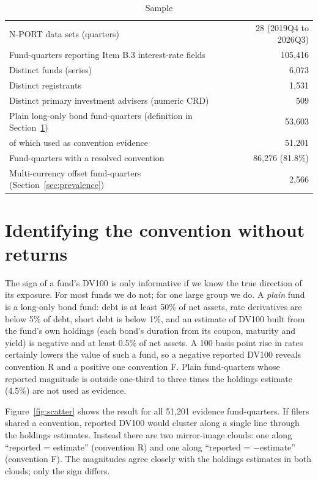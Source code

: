 \documentclass[11pt]{article}
\begin{document}
\begin{table}[!htb]
\centering\small
\caption{Sample}\label{tab:sample}
\begin{tabular}{lr}
\toprule
N-PORT data sets (quarters) & 28 (2019Q4 to 2026Q3) \\
Fund-quarters reporting Item B.3 interest-rate fields & 105,416 \\
Distinct funds (series) & 6,073 \\
Distinct registrants & 1,531 \\
Distinct primary investment advisers (numeric CRD) & 509 \\
Plain long-only bond fund-quarters (definition in Section~\ref{sec:method}) & 53,603 \\
\quad of which used as convention evidence & 51,201 \\
Fund-quarters with a resolved convention & 86,276 (81.8\%) \\
Multi-currency offset fund-quarters (Section~\ref{sec:prevalence}) & 2,566 \\
\bottomrule
\end{tabular}
\end{table}

\section{Identifying the convention without returns}\label{sec:method}

The sign of a fund's DV100 is only informative if we know the true direction of its exposure. For
most funds we do not; for one large group we do. A \emph{plain} fund is a long-only bond fund: debt
is at least 50\% of net assets, rate derivatives are below 5\% of debt, short debt is below 1\%, and
an estimate of DV100 built from the fund's own holdings (each bond's duration from its coupon,
maturity and yield) is negative and at least 0.5\% of net assets. A 100 basis point rise in rates
certainly lowers the value of such a fund, so a negative reported DV100 reveals convention R and a
positive one convention F. Plain fund-quarters whose reported magnitude is outside one-third to three
times the holdings estimate (4.5\%) are not used as evidence.

Figure~\ref{fig:scatter} shows the result for all 51,201 evidence fund-quarters. If filers shared a
convention, reported DV100 would cluster along a single line through the holdings estimates. Instead
there are two mirror-image clouds: one along ``reported = estimate'' (convention R) and one along
``reported = $-$estimate'' (convention F). The magnitudes agree closely with the holdings estimates
in both clouds; only the sign differs.
\end{document}
